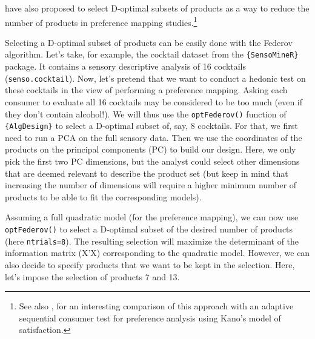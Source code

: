 \documentclass[
]{krantz}
\makeatletter
\newenvironment{Shaded}{\begin{snugshade}}{\end{snugshade}}
\newcommand{\AttributeTok}[1]{\textcolor[rgb]{0.61,0.61,0.61}{#1}}
\newcommand{\ConstantTok}[1]{\textcolor[rgb]{0,0,0}{#1}}
\newcommand{\DecValTok}[1]{\textcolor[rgb]{0.06,0.06,0.06}{#1}}
\newcommand{\FunctionTok}[1]{\textcolor[rgb]{0,0,0}{#1}}
\newcommand{\NormalTok}[1]{#1}
\newcommand{\OtherTok}[1]{\textcolor[rgb]{0.37,0.37,0.37}{#1}}
\newcommand{\SpecialCharTok}[1]{\textcolor[rgb]{0,0,0}{#1}}
\newenvironment{kframe}{%
\medskip{}
\setlength{\fboxsep}{.8em}
 \def\at@end@of@kframe{}%
 \ifinner\ifhmode%
  \def\at@end@of@kframe{\end{minipage}}%
  \begin{minipage}{\columnwidth}%
 \fi\fi%
 \def\FrameCommand##1{\hskip\@totalleftmargin \hskip-\fboxsep
 \colorbox{shadecolor}{##1}\hskip-\fboxsep
     \hskip-\linewidth \hskip-\@totalleftmargin \hskip\columnwidth}%
 \MakeFramed {\advance\hsize-\width
   \@totalleftmargin\z@ \linewidth\hsize
   \@setminipage}}%
 {\par\unskip\endMakeFramed%
 \at@end@of@kframe}
\renewenvironment{Shaded}{\begin{kframe}}{\end{kframe}}
\makeatother
\begin{document}
\citet{benslama1998} have also proposed to select D-optimal subsets of products as a way to reduce the number of products in preference mapping studies.\footnote{See also \citep{riviere2006}, for an interesting comparison of this approach with an adaptive sequential consumer test for preference analysis using Kano's model of satisfaction.}

Selecting a D-optimal subset of products can be easily done with the Federov algorithm. Let's take, for example, the cocktail dataset from the \texttt{\{SensoMineR\}} package. It contains a sensory descriptive analysis of 16 cocktails (\texttt{senso.cocktail}).
Now, let's pretend that we want to conduct a hedonic test on these cocktails in the view of performing a preference mapping. Asking each consumer to evaluate all 16 cocktails may be considered to be too much (even if they don't contain alcohol!). We will thus use the \texttt{optFederov()} function of \texttt{\{AlgDesign\}} to select a D-optimal subset of, say, 8 cocktails. For that, we first need to run a PCA on the full sensory data. Then we use the coordinates of the products on the principal components (PC) to build our design. Here, we only pick the first two PC dimensions, but the analyst could select other dimensions that are deemed relevant to describe the product set (but keep in mind that increasing the number of dimensions will require a higher minimum number of products to be able to fit the corresponding models).

\begin{Shaded}
\end{Shaded}

Assuming a full quadratic model (for the preference mapping), we can now use \texttt{optFederov()} to select a D-optimal subset of the desired number of products (here \texttt{ntrials=8}). The resulting selection will maximize the determinant of the information matrix (X'X) corresponding to the quadratic model. However, we can also decide to specify products that we want to be kept in the selection. Here, let's impose the selection of products 7 and 13.
\end{document}

